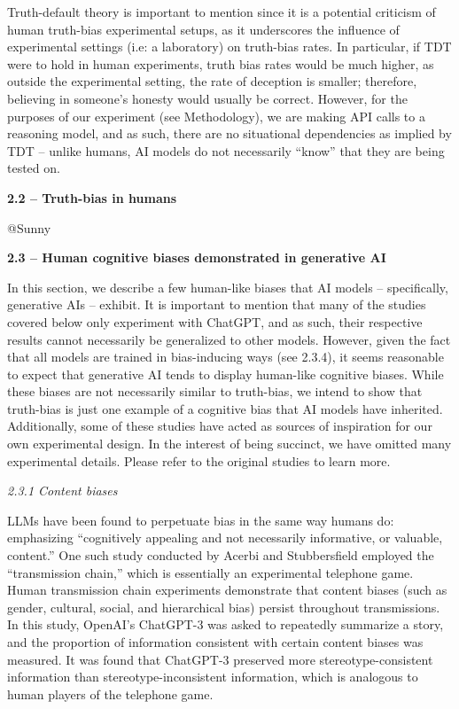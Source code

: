 \documentclass{article}
\begin{document}
Truth-default theory is important to mention since it is a potential criticism of human truth-bias experimental setups, as it underscores the influence of experimental settings (i.e: a laboratory) on truth-bias rates. In particular, if TDT were to hold in human experiments, truth bias rates would be much higher, as outside the experimental setting, the rate of deception is smaller; therefore, believing in someone's honesty would usually be correct. \citep{levine_truth-default_2014} However, for the purposes of our experiment (see Methodology), we are making API calls to a reasoning model, and as such, there are no situational dependencies as implied by TDT – unlike humans, AI models do not necessarily “know” that they are being tested on. \newline

\textbf{2.2 – Truth-bias in humans}

@Sunny

\textbf{2.3 – Human cognitive biases demonstrated in generative AI}

In this section, we describe a few human-like biases that AI models – specifically, generative AIs – exhibit. It is important to mention that many of the studies covered below only experiment with ChatGPT, and as such, their respective results cannot necessarily be generalized to other models. However, given the fact that all models are trained in bias-inducing ways (see 2.3.4), it seems reasonable to expect that generative AI tends to display human-like cognitive biases. While these biases are not necessarily similar to truth-bias, we intend to show that truth-bias is just one example of a cognitive bias that AI models have inherited. Additionally, some of these studies have acted as sources of inspiration for our own experimental design. In the interest of being succinct, we have omitted many experimental details. Please refer to the original studies to learn more.

\textit{2.3.1 Content biases}

LLMs have been found to perpetuate bias in the same way humans do: emphasizing “cognitively appealing and not necessarily informative, or valuable, content.” One such study conducted by Acerbi and Stubbersfield employed the “transmission chain,” which is essentially an experimental telephone game. Human transmission chain experiments demonstrate that content biases (such as gender, cultural, social, and hierarchical bias) persist throughout transmissions. \citep{mesoudi_multiple_2008} In this study, OpenAI’s ChatGPT-3 was asked to repeatedly summarize a story, and the proportion of information consistent with certain content biases was measured. It was found that ChatGPT-3 preserved more stereotype-consistent information than stereotype-inconsistent information, which is analogous to human players of the telephone game. \citep{acerbi_large_2023}
\end{document}
